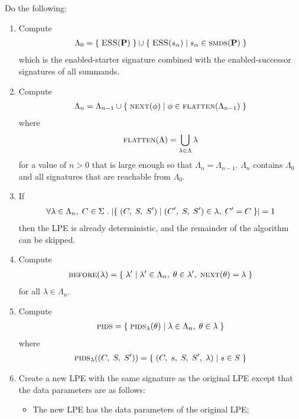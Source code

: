 Do the following:
\begin{enumerate}[1.]
\item Compute
\begin{align*}
\Lambda_0 = \{\;\textsc{ESS}(\mathbf{P})\;\} \cup \{\;\textsc{ESS}(s_\alpha)\;|\;s_\alpha \in \textsc{smds}(\mathbf{P})\;\}
\end{align*}
which is the enabled-starter signature combined with the enabled-successor signatures of all summands.
\item Compute
\begin{align*}
\Lambda_n = \Lambda_{n-1} \cup \{\;\textsc{next}(\phi)\;|\;\phi \in \textsc{flatten}(\Lambda_{n-1})\;\}
\end{align*}
where
\begin{align*}
\textsc{flatten}(\Lambda) = \bigcup\limits_{\lambda \in \Lambda} \lambda
\end{align*}
for a value of $n > 0$ that is large enough so that $\Lambda_n = \Lambda_{n-1}$.
$\Lambda_n$ contains $\Lambda_0$ and all signatures that are reachable from $\Lambda_0$.
\item If
\begin{align*}
\forall \lambda \in \Lambda_n,\; C \in \Sigma \; .\; |\{\;(C,\; S,\; {S}^\prime)\;|\;({C}^\prime,\; S,\; {S}^\prime) \in \lambda,\; {C}^\prime = C\;\}| = 1
\end{align*}
then the LPE is already deterministic, and the remainder of the algorithm can be skipped.
\item Compute
\begin{align*}
\textsc{before}(\lambda) = \{\;{\lambda}^\prime\;|\;{\lambda}^\prime \in \Lambda_n,\; \theta \in {\lambda}^\prime,\; \textsc{next}(\theta) = \lambda\;\}
\end{align*}
for all $\lambda \in \Lambda_n$.
\item Compute
\begin{align*}
\textsc{pids} = \{\;\textsc{pids}_\lambda(\theta)\;|\;\lambda \in \Lambda_n,\; \theta \in \lambda\;\}
\end{align*}
where
\begin{align*}
\textsc{pids}_\lambda((C,\; S,\; {S}^\prime)) = \{\;(C,\; s,\; S,\; {S}^\prime,\; \lambda)\;|\;s \in S\;\}
\end{align*}
\item Create a new LPE with the same signature as the original LPE except that the data parameters are as follows:
\begin{itemize}
\item The new LPE has the data parameters of the original LPE;

\end{itemize}
\end{enumerate}
